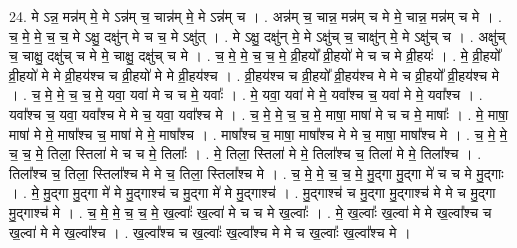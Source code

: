 \documentclass[17pt]{extarticle}
\begin{document}
24. मे ऽन्न॒ मन्न॑म् मे॒ मे ऽन्न॑म् च॒ चान्न॑म् मे॒ मे ऽन्न॑म् च । . अन्न॑म् च॒ चान्न॒ मन्न॑म् च मे मे॒ चान्न॒ मन्न॑म् च मे । . च॒ मे॒ मे॒ च॒ च॒ मे ऽक्षु॒ दक्षु॑न् मे च च॒ मे ऽक्षु॑त् । . मे ऽक्षु॒ दक्षु॑न् मे॒ मे ऽक्षु॑च् च॒ चाक्षु॑न् मे॒ मे ऽक्षु॑च् च । . अक्षु॑च् च॒ चाक्षु॒ दक्षु॑च् च मे मे॒ चाक्षु॒ दक्षु॑च् च मे । . च॒ मे॒ मे॒ च॒ च॒ मे॒ व्री॒हयो᳚ व्री॒हयो॑ मे च च मे व्री॒हयः॑ । . मे॒ व्री॒हयो᳚ व्री॒हयो॑ मे मे व्री॒हय॑श्च च व्री॒हयो॑ मे मे व्री॒हय॑श्च । . व्री॒हय॑श्च च व्री॒हयो᳚ व्री॒हय॑श्च मे मे च व्री॒हयो᳚ व्री॒हय॑श्च मे । . च॒ मे॒ मे॒ च॒ च॒ मे॒ यवा॒ यवा॑ मे च च मे॒ यवाः᳚ । . मे॒ यवा॒ यवा॑ मे मे॒ यवा᳚श्च च॒ यवा॑ मे मे॒ यवा᳚श्च । . यवा᳚श्च च॒ यवा॒ यवा᳚श्च मे मे च॒ यवा॒ यवा᳚श्च मे । . च॒ मे॒ मे॒ च॒ च॒ मे॒ माषा॒ माषा॑ मे च च मे॒ माषाः᳚ । . मे॒ माषा॒ माषा॑ मे मे॒ माषा᳚श्च च॒ माषा॑ मे मे॒ माषा᳚श्च । . माषा᳚श्च च॒ माषा॒ माषा᳚श्च मे मे च॒ माषा॒ माषा᳚श्च मे । . च॒ मे॒ मे॒ च॒ च॒ मे॒ तिला॒ स्तिला॑ मे च च मे॒ तिलाः᳚ । . मे॒ तिला॒ स्तिला॑ मे मे॒ तिला᳚श्च च॒ तिला॑ मे मे॒ तिला᳚श्च । . तिला᳚श्च च॒ तिला॒ स्तिला᳚श्च मे मे च॒ तिला॒ स्तिला᳚श्च मे । . च॒ मे॒ मे॒ च॒ च॒ मे॒ मु॒द्‍गा मु॒द्‍गा मे॑ च च मे मु॒द्‍गाः । . मे॒ मु॒द्‍गा मु॒द्‍गा मे॑ मे मु॒द्‍गाश्च॑ च मु॒द्‍गा मे॑ मे मु॒द्‍गाश्च॑ । . मु॒द्‍गाश्च॑ च मु॒द्‍गा मु॒द्‍गाश्च॑ मे मे च मु॒द्‍गा मु॒द्‍गाश्च॑ मे । . च॒ मे॒ मे॒ च॒ च॒ मे॒ ख॒ल्वाः᳚ ख॒ल्वा॑ मे च च मे ख॒ल्वाः᳚ । . मे॒ ख॒ल्वाः᳚ ख॒ल्वा॑ मे मे ख॒ल्वा᳚श्च च ख॒ल्वा॑ मे मे ख॒ल्वा᳚श्च । . ख॒ल्वा᳚श्च च ख॒ल्वाः᳚ ख॒ल्वा᳚श्च मे मे च ख॒ल्वाः᳚ ख॒ल्वा᳚श्च मे । \newline
\end{document}
